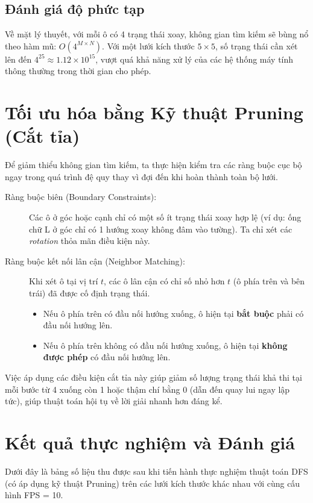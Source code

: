 \documentclass[12pt,a4paper]{article}
\begin{document}
\subsection{Đánh giá độ phức tạp}
Về mặt lý thuyết, với mỗi ô có 4 trạng thái xoay, không gian tìm kiếm sẽ bùng nổ theo hàm mũ: $O(4^{M \times N})$. Với một lưới kích thước $5 \times 5$, số trạng thái cần xét lên đến $4^{25} \approx 1.12 \times 10^{15}$, vượt quá khả năng xử lý của các hệ thống máy tính thông thường trong thời gian cho phép.

\section{Tối ưu hóa bằng Kỹ thuật Pruning (Cắt tỉa)}
Để giảm thiểu không gian tìm kiếm, ta thực hiện kiểm tra các ràng buộc cục bộ ngay trong quá trình đệ quy thay vì đợi đến khi hoàn thành toàn bộ lưới.

\begin{description}
    \item[Ràng buộc biên (Boundary Constraints):] Các ô ở góc hoặc cạnh chỉ có một số ít trạng thái xoay hợp lệ (ví dụ: ống chữ L ở góc chỉ có 1 hướng xoay không đâm vào tường). Ta chỉ xét các \textit{rotation} thỏa mãn điều kiện này.
    
    \item[Ràng buộc kết nối lân cận (Neighbor Matching):] Khi xét ô tại vị trí $t$, các ô lân cận có chỉ số nhỏ hơn $t$ (ô phía trên và bên trái) đã được cố định trạng thái. 
    \begin{itemize}
        \item Nếu ô phía trên có đầu nối hướng xuống, ô hiện tại \textbf{bắt buộc} phải có đầu nối hướng lên.
        \item Nếu ô phía trên không có đầu nối hướng xuống, ô hiện tại \textbf{không được phép} có đầu nối hướng lên.
    \end{itemize}
\end{description}

Việc áp dụng các điều kiện cắt tỉa này giúp giảm số lượng trạng thái khả thi tại mỗi bước từ 4 xuống còn 1 hoặc thậm chí bằng 0 (dẫn đến quay lui ngay lập tức), giúp thuật toán hội tụ về lời giải nhanh hơn đáng kể.

\section{Kết quả thực nghiệm và Đánh giá}

Dưới đây là bảng số liệu thu được sau khi tiến hành thực nghiệm thuật toán DFS (có áp dụng kỹ thuật Pruning) trên các lưới kích thước khác nhau với cùng cấu hình FPS = 10.
\end{document}
